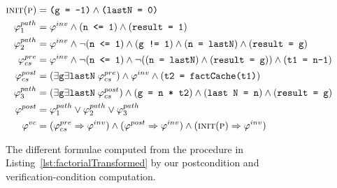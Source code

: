 \begin{figure}
\begin{align*}
\textsc{init}(\textsc{p}) &= \texttt{(g = -1)} \wedge \texttt{(lastN = 0)} \\
\varphi^{path}_1 &= \varphi^{inv} \wedge (\texttt{n <= 1}) \wedge (\texttt{result = 1}) \\
\varphi^{path}_2 &= \varphi^{inv} \wedge \neg(\texttt{n <= 1}) \wedge (\texttt{g != 1}) \wedge (\texttt{n = lastN}) \wedge (\texttt{result = g}) \\
\varphi^{pre}_{cs} &= \varphi^{inv} \wedge \neg(\texttt{n <= 1}) \wedge \neg((\texttt{n = lastN}) \wedge (\texttt{result = g})) \wedge (\texttt{t1 = n-1}) \\
\varphi^{post}_{cs} &= (\exists \texttt{g} \exists \texttt{lastN} \; \varphi^{pre}_{cs}) \wedge \varphi^{inv} \wedge (\texttt{t2 = factCache(t1)}) \\
\varphi^{path}_3 &= (\exists \texttt{g} \exists \texttt{lastN} \; \varphi^{post}_{cs}) \wedge (\texttt{g = n * t2}) \wedge (\texttt{last N = n}) \wedge (\texttt{result = g}) \\
\varphi^{post} &= \varphi^{path}_1 \vee \varphi^{path}_2 \vee \varphi^{path}_3 \\
\varphi^{vc} &= (\varphi^{pre}_{cs} \Rightarrow \varphi^{inv}) \wedge (\varphi^{post} \Rightarrow \varphi^{inv}) \wedge (\textsc{init}(\textsc{p}) \Rightarrow \varphi^{inv})
\end{align*}
\caption{
The different formulae computed from the procedure in Listing~\ref{lst:factorialTransformed} 
by our postcondition and verification-condition computation.
}
\label{fig:pathCondition}
\end{figure}

